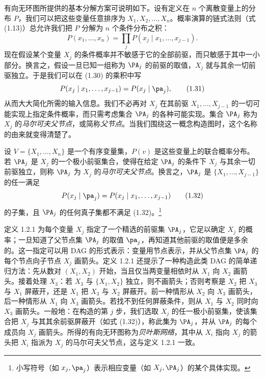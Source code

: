 有向无环图所提供的基本分解方案可说明如下。设有定义在 $n$ 个离散变量上的分布 $P$，我们可以把这些变量任意排序为 $X_1,X_2,\dots,X_n$。概率演算的链式法则（式 \textup{(1.13)}）总允许我们把 $P$ 分解为 $n$ 个条件分布之积：
\begin{equation}
P(x_1,\dots,x_n) = \prod_{j} P(x_j \mid x_1,\dots,x_{j-1}). \tag{1.30}
\end{equation}
现在假设某个变量 $X_j$ 的条件概率并不敏感于它的全部前驱，而只敏感于其中一小部分。换言之，假设一旦已知一组称为 $\PA_j$ 的前驱的取值，$X_j$ 就与其余一切前驱独立。于是我们可以在 \textup{(1.30)} 的乘积中写
\begin{equation}
P(x_j \mid x_1,\dots,x_{j-1}) = P(x_j \mid \pa_j), \tag{1.31}
\end{equation}
从而大大简化所需的输入信息。我们不必再对 $X_j$ 在其前驱 $X_1,\dots,X_{j-1}$ 的一切可能实现上指定条件概率，而只需考虑集合 $\PA_j$ 的各种可能实现。集合 $\PA_j$ 称为 $X_j$ 的\emph{马尔可夫父节点}，或简称\emph{父节点}。当我们围绕这一概念构造图时，这个名称的由来就变得清楚了。

\begin{definition}[马尔可夫父节点]
设 $V=\{X_1,\dots,X_n\}$ 是一个有序变量集，$P(v)$ 是这些变量上的联合概率分布。若 $\PA_j$ 是 $X_j$ 的一个极小前驱集合，使得在给定 $\PA_j$ 的条件下 $X_j$ 与其余一切前驱独立，则称 $\PA_j$ 为 $X_j$ 的\emph{马尔可夫父节点}。换言之，$\PA_j$ 是 $\{X_1,\dots,X_{j-1}\}$ 的任一满足
\begin{equation}
P(x_j \mid \pa_j) = P(x_j \mid x_1,\dots,x_{j-1}) \tag{1.32}
\end{equation}
的子集，且 $\PA_j$ 的任何真子集都不满足 \textup{(1.32)}。\footnote{小写符号（如 $x_j,\pa_j$）表示相应变量（如 $X_j,\PA_j$）的某个具体实现。}
\end{definition}

定义 1.2.1 为每个变量 $X_j$ 指定了一个精选的前驱集 $\PA_j$，它足以确定 $X_j$ 的概率；一旦知道了父节点集 $\PA_j$ 的取值 $\pa_j$，再知道其他前驱的取值便是多余的。这一指定可以用 DAG 的形式表示：变量用节点表示，并从父节点集 $\PA_j$ 的每个节点向子节点 $X_j$ 画箭头。定义 1.2.1 还提示了一种构造此类 DAG 的简单递归方法：先从数对 $(X_1,X_2)$ 开始，当且仅当两变量相依时从 $X_1$ 向 $X_2$ 画箭头。接着处理 $X_3$：若 $X_3$ 与 $\{X_1,X_2\}$ 独立，则不画箭头；否则考察是 $X_2$ 把 $X_3$ 与 $X_1$ 屏蔽开，还是 $X_1$ 把 $X_3$ 与 $X_2$ 屏蔽开。前一种情形从 $X_2$ 向 $X_3$ 画箭头，后一种情形从 $X_1$ 向 $X_3$ 画箭头。若找不到任何屏蔽条件，则从 $X_1$ 与 $X_2$ 同时向 $X_3$ 画箭头。一般地：在构造的第 $j$ 步，我们选取 $X_j$ 的任一极小前驱集，使该集合把 $X_j$ 与其其余前驱屏蔽开（如式 \textup{(1.32)}），称此集为 $\PA_j$，并从 $\PA_j$ 的每个成员向 $X_j$ 画箭头。所得的有向无环图称为\emph{贝叶斯网络}，其中从 $X_i$ 指向 $X_j$ 的箭头把 $X_i$ 指派为 $X_j$ 的马尔可夫父节点，这与定义 1.2.1 一致。

